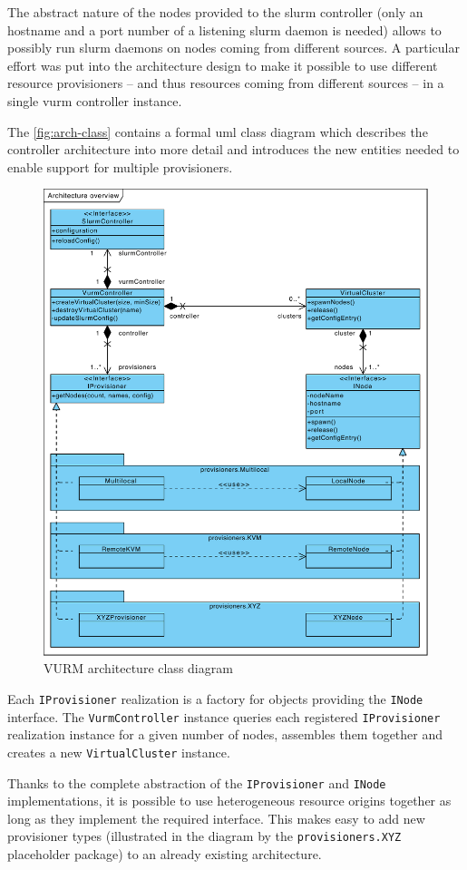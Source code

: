 The abstract nature of the nodes provided to the \gls{slurm} controller (only an hostname and a port number of a listening \gls{slurm} daemon is needed) allows to possibly run \gls{slurm} daemons on nodes coming from different sources. A particular effort was put into the architecture design to make it possible to use different resource provisioners -- and thus resources coming from different sources -- in a single \gls{vurm} controller instance.

The \autoref{fig:arch-class} contains a formal \gls{uml} class diagram which describes the controller architecture into more detail and introduces the new entities needed to enable support for multiple provisioners.

\begin{figure}[ht]
	\centering
	\includegraphics[width=.7\textwidth]{figures/arch-class}
	\caption{VURM architecture class diagram}
	\label{fig:arch-class}
\end{figure}

Each \texttt{IProvisioner} realization is a factory for objects providing the \texttt{INode} interface. The \texttt{VurmController} instance queries each registered \texttt{IProvisioner} realization instance for a given number of nodes, assembles them together and creates a new \texttt{VirtualCluster} instance.

Thanks to the complete abstraction of the \texttt{IProvisioner} and \texttt{INode} implementations, it is possible to use heterogeneous resource origins together as long as they implement the required interface. This makes easy to add new provisioner types (illustrated in the diagram by the \texttt{provisioners.XYZ} placeholder package) to an already existing architecture.

